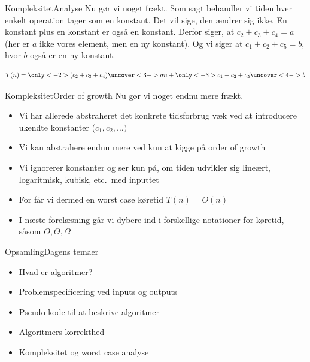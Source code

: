 \documentclass{beamer}
\begin{document}
\begin{frame}{Kompleksitet}{Analyse}
    Nu gør vi noget frækt. \pause Som sagt behandler vi tiden hver enkelt
    operation tager som en konstant. Det vil sige, den ændrer sig ikke. En
    konstant plus en konstant er også en konstant. Derfor siger, at $c_2 + c_3 +
    c_4 = a$ (her er $a$ ikke vores element, men en ny konstant). Og vi siger at
    $c_1 + c_2 + c_5 = b$, hvor $b$ også er en ny konstant.

    \begin{equation*}
        T(n) = \only<-2>{(c_2 + c_3 + c_4)}\uncover<3->{a}n + \only<-3>{c_1 + c_2
        + c_5}\uncover<4->{b}
    \end{equation*}

\end{frame}

\begin{frame}{Kompleksitet}{Order of growth}
    Nu gør vi noget endnu mere frækt. \pause

    \begin{itemize}
        \item Vi har allerede abstraheret det konkrete tidsforbrug væk ved at
            introducere ukendte konstanter ($c_1, c_2, \ldots)$
            \pause
        \item Vi kan abstrahere endnu mere ved kun at kigge på \alert{order of
            growth}
            \pause
        \item Vi \alert{ignorerer konstanter} og ser kun på, om tiden udvikler
            sig \alert{lineært}, \alert{logaritmisk}, \alert{kubisk}, etc.\ med
            inputtet
            \pause
        \item For  får vi dermed en worst case køretid
            \alert{$T(n) = O(n)$}
            \pause
        \item I næste forelæsning går vi dybere ind i forskellige notationer for
            køretid, såsom $O, \Theta, \Omega$
    \end{itemize}
    
\end{frame}

\begin{frame}{Opsamling}{Dagens temaer}
    \begin{itemize}
        \item Hvad er algoritmer? 
        \item Problemspecificering ved inputs og outputs
        \item Pseudo-kode til at beskrive algoritmer
        \item Algoritmers korrekthed
        \item Kompleksitet og worst case analyse
    \end{itemize}
\end{frame}
\end{document}
